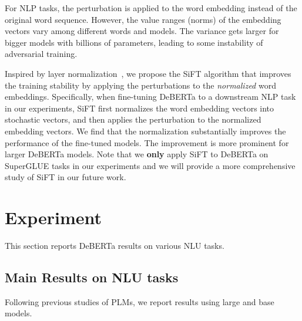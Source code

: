 \documentclass{article}
\newcommand\ModelName{DeBERTa}
\begin{document}
For NLP tasks, the perturbation is applied to the word embedding instead of the original word sequence. However, the value ranges (norms) of the embedding vectors vary among different words and models. The variance gets larger for bigger models with billions of parameters, leading to some instability of adversarial training. 

Inspired by layer normalization~\citep{ba2016layer}, we propose the SiFT algorithm that improves the training stability by applying the perturbations to the \emph{normalized} word embeddings. 
Specifically, when fine-tuning DeBERTa to a downstream NLP task in our experiments, SiFT first normalizes the word embedding vectors into stochastic vectors, and then applies the perturbation to the normalized embedding vectors. We find that the normalization substantially improves the performance of the fine-tuned models. The improvement is more prominent for larger DeBERTa models. 
Note that we \textbf{only} apply SiFT to  {\ModelName} on SuperGLUE tasks in our experiments and we will provide a more comprehensive study of SiFT in our future work.

 \section{Experiment}
This section reports {\ModelName} results on various NLU tasks. 




\subsection{Main Results on NLU tasks}
\label{subsec:main}
Following previous studies of PLMs,
we report results using large and base models.
\end{document}
